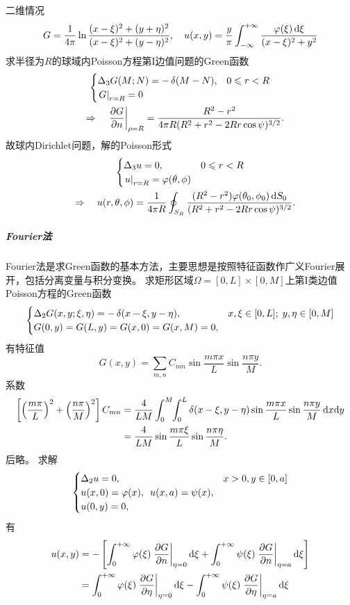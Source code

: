 二维情况
\[G=\frac1{4\pi}\ln\frac{(x-\xi)^2+(y+\eta)^2}{(x-\xi)^2+(y-\eta)^2},\quad u(x,y)=\frac y\pi\int\iti\frac{\varphi(\xi)\d\xi}{(x-\xi)^2+y^2}\]
\eg[2] 求半径为$R$的球域内Poisson方程第I边值问题的Green函数
\begin{gather*}
	\begin{cases}
		\lap_3G(M;N)=-\vd(M-N),&0\leqslant r<R\\
		\edg G_{r=R}=0
	\end{cases}\\
	\thus \edg{\pv Gn}_{\rho=R}=\frac{R^2-r^2}{4\pi R(R^2+r^2-2Rr\cos\psi)^{3/2}}.
\end{gather*}
故球内Dirichlet问题，解的Poisson形式
\begin{gather*}
	\begin{cases}
		\lap_3u=0,&0\leqslant r<R\\
		\edg u_{r=R}=\varphi(\theta,\phi)
	\end{cases}\\
	\thus u(r,\theta,\phi)=\frac1{4\pi R}\oint_{S_R}\frac{(R^2-r^2)\varphi(\theta_0,\phi_0)\d S_0}{(R^2+r^2-2Rr\cos\psi)^{3/2}}.
\end{gather*}
\subparagraph*{Fourier法}
Fourier法是求Green函数的基本方法，主要思想是按照特征函数作广义Fourier展开，包括分离变量与积分变换。
\eg[1] 求矩形区域$\Omega=[0,L]\times[0,M]$上第I类边值Poisson方程的Green函数
\begin{align*}
	\begin{cases}
		\lap_2G(x,y;\xi,\eta)=-\vd(x-\xi,y-\eta),&x,\xi\in[0,L];\;y,\eta\in[0,M]\\
		G(0,y)=G(L,y)=G(x,0)=G(x,M)=0,
	\end{cases}
\end{align*}
有特征值 
\[G(x,y)=\sum_{m,n}C_{mn}\sin\frac{m\pi x}L\sin\frac{n\pi y}M.\]
系数 
{\small\begin{align*}
	\fkh{\kh{\frac{m\pi}L}^2+\kh{\frac{n\pi}M}^2}C_{mn}&=\frac4{LM}\int_0^M\bs3\int_0^L\vd(x-\xi,y-\eta)\sin\frac{m\pi x}L\sin\frac{n\pi y}M\d x\nd y\\
	&=\frac4{LM}\sin\frac{m\pi\xi}L\sin\frac{n\pi\eta}M.
\end{align*}}
后略。
\eg[2] 求解 
\begin{align*}
	\begin{cases}
		\lap_2u=0,& x>0,y\in[0,a]\\
		u(x,0)=\varphi(x),\enspace u(x,a)=\psi(x),\\
		u(0,y)=0,
	\end{cases}
\end{align*}
有
\begin{align*}
	u(x,y)&=-\fkh{\int\zti\varphi(\xi)\edg{\pv Gn}_{\eta=0}\d\xi+\int\zti\psi(\xi)\edg{\pv Gn}_{\eta=a}\d\xi}\\
	&=\int\zti\varphi(\xi)\edg{\pv G\eta}_{\eta=0}\d\xi-\int\zti\psi(\xi)\edg{\pv G\eta}_{\eta=a}\d\xi
\end{align*}

